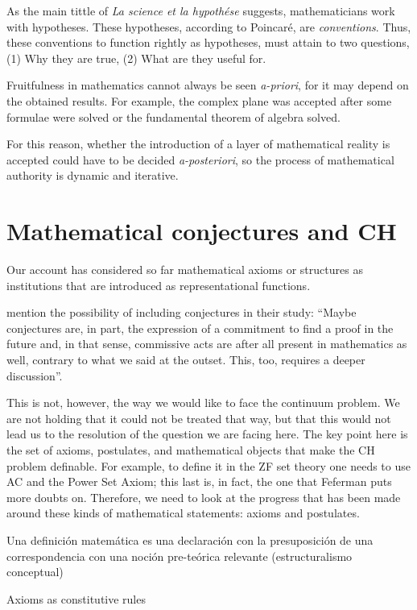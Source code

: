 \documentclass[11pt,a4paper]{article}
\begin{document}
As the main tittle of \textit{La science et la hypothése} suggests, mathematicians work with hypotheses. These hypotheses, according to Poincaré, are \textit{conventions}. Thus, these conventions to function rightly as hypotheses, must attain to two questions, (1) Why they are true, (2) What are they useful for.

Fruitfulness in mathematics cannot always be seen \textit{a-priori}, for it may depend on the obtained results. For example, the complex plane was accepted after some formulae were solved or the fundamental theorem of algebra solved.

For this reason, whether the introduction of a layer of mathematical reality is accepted could have to be decided \textit{a-posteriori}, so the process of mathematical authority is dynamic and iterative.

\section{Mathematical conjectures and CH}

Our account has considered so far mathematical axioms or structures as institutions that are introduced as representational functions.  

\textcite[10087]{RuffinoEtAl2021} mention the possibility of including conjectures in their study: “Maybe conjectures are, in part, the expression of a commitment to find a proof in the future and, in that sense, commissive acts are after all present in mathematics as well, contrary to what we said at the outset. This, too, requires a deeper discussion”.  

This is not, however, the way we would like to face the continuum problem. We are not holding that it could not be treated that way, but that this would not lead us to the resolution of the question we are facing here. The key point here is the set of axioms, postulates, and mathematical objects that make the CH problem definable. For example, to define it in the ZF set theory one needs to use AC and the Power Set Axiom; this last is, in fact, the one that Feferman puts more doubts on. Therefore, we need to look at the progress that has been made around these kinds of mathematical statements: axioms and postulates.

Una definición matemática es una declaración con la presuposición de una correspondencia con una noción pre-teórica relevante (estructuralismo conceptual) 

Axioms as constitutive rules 
\end{document}
